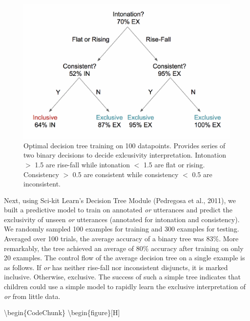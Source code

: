 \documentclass[10pt, letterpaper]{article}
\newenvironment{CodeChunk}{}{}
\begin{document}
\begin{CodeChunk}
\begin{figure}[H]

{\centering \includegraphics{figs/treeDiagram-1} 

}

\caption[Optimal decision tree training on 100 datapoints]{Optimal decision tree training on 100 datapoints. Provides series of two binary decisions to decide exlcusivity interpretation. Intonation $>$ 1.5 are rise-fall while intonation $<$ 1.5 are flat or rising. Consistency $>$ 0.5 are consistent while consistency $<$ 0.5 are  inconsistent.}\label{fig:treeDiagram}
\end{figure}
\end{CodeChunk}

Next, using Sci-kit Learn's Decision Tree Module (Pedregosa et al.,
2011), we built a predictive model to train on annotated \emph{or}
utterances and predict the exclusivity of unseen \emph{or} utterances
(annotated for intonation and consistency). We randomly sampled 100
examples for training and 300 examples for testing. Averaged over 100
trials, the average accuracy of a binary tree was 83\%. More remarkably,
the tree achieved an average of 80\% accuracy after training on only 20
examples. The control flow of the average decision tree on a single
example is as follows. If \emph{or} has neither rise-fall nor
inconsistent disjuncts, it is marked inclusive. Otherwise, exclusive.
The success of such a simple tree indicates that children could use a
simple model to rapidly learn the exclusive interpretation of \emph{or}
from little data.

\textbackslash{}begin\{CodeChunk\}
\textbackslash{}begin\{figure\}{[}H{]}
\end{document}
